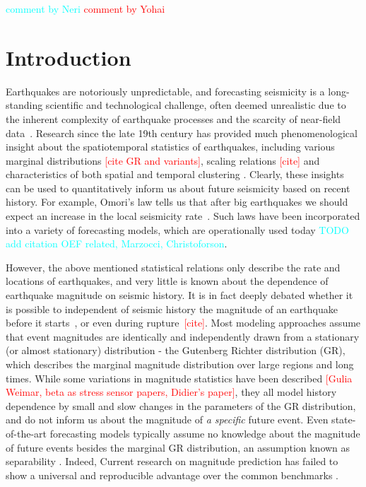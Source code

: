 \documentclass[pdflatex]{sn-jnl}
\newcommand{\yohai}[1]{{\textcolor{red}{#1}}}
\newcommand{\neri}[1]{{\textcolor{cyan}{#1}}}
\begin{document}
\maketitle

\neri{comment by Neri} \newline
\yohai{comment by Yohai}


\section{Introduction} \label{sec:introduction}
Earthquakes are notoriously unpredictable, and forecasting seismicity is a long-standing scientific and technological challenge, often deemed unrealistic due to the inherent complexity of earthquake processes and the scarcity of near-field data~\cite{bernard_earthquake_1999, geller_earthquakes_1997}. 
Research since the late 19th century has provided much phenomenological insight about the spatiotemporal statistics of earthquakes, including various marginal distributions \yohai{[cite GR and variants]}, scaling relations \yohai{[cite]} and characteristics of both spatial and temporal clustering \cite{omori_after-shocks_1894, kagan_short-term_2004, ben-zion_localization_2020}. Clearly, these insights can be used to quantitatively inform us about future seismicity based on recent history. For example, Omori's law tells us that after big earthquakes we should expect an increase in the local seismicity rate~\cite{omori_after-shocks_1894}. Such laws have been incorporated into a variety of forecasting models, which are operationally used today\cite{ogata_statistical_1988, hardebeck_aftershock_2024, devries_deep_2018, king_static_1994} \neri{TODO add citation OEF related, Marzocci, Christoforson}.

However, the above mentioned statistical relations only describe the rate and locations of earthquakes, and very little is known about the dependence of earthquake magnitude on seismic history.
It is in fact deeply debated whether it is possible to independent of seismic history the magnitude of an earthquake before it starts~\cite{gutenberg_frequency_1944, kagan_seismic_2002, ogata_exploring_2018}, or even during rupture~\yohai{[cite]}.
Most modeling approaches assume that event magnitudes are identically and independently drawn from a stationary (or almost stationary) distribution - the Gutenberg Richter distribution (GR), which describes the marginal magnitude distribution over large regions and long times. 
While some variations in magnitude statistics have been described \yohai{[Gulia Weimar, beta as stress sensor papers, Didier's paper]}, they all model history dependence by small and slow changes in the parameters of the GR distribution, and do not inform us about the magnitude of \textit{a specific} future event. Even state-of-the-art forecasting models typically assume no knowledge about the magnitude of future events besides the marginal GR distribution, an assumption known as separability \cite{schoenberg_testing_2004}. Indeed, Current research on magnitude prediction has failed to show a universal and reproducible advantage over the common benchmarks \cite{shcherbakov_forecasting_2019, ogata_exploring_2018, stockman_forecasting_2023,  panakkat_neural_2007}.
\end{document}

